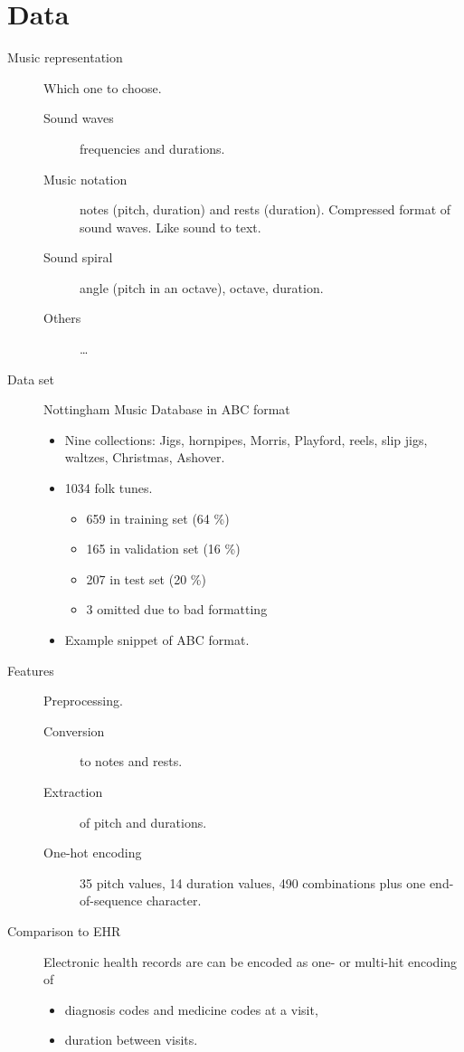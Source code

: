 \section{Data}
\label{sec:data}

\begin{description}
	\item[Music representation] Which one to choose.
	
	\begin{description}
		\item[Sound waves] frequencies and durations.
		\item[Music notation] notes (pitch, duration) and rests (duration).
		Compressed format of sound waves. Like sound to text.
		\item[Sound spiral] angle (pitch in an octave), octave, duration.
		\item[Others] \dots
	\end{description}
	
	\item[Data set] Nottingham Music Database in ABC format
	
	\begin{itemize}
		\item Nine collections: Jigs, hornpipes, Morris, Playford, reels, slip jigs, waltzes, Christmas, Ashover.
		\item 1034 folk tunes.
		
		\begin{itemize}
			\item 659 in training set (64 \%)
			\item 165 in validation set (16 \%)
			\item 207 in test set (20 \%)
			\item 3 omitted due to bad formatting
		\end{itemize}
		
		\item Example snippet of ABC format.
	\end{itemize}
	
	\item[Features] Preprocessing.
	
	\begin{description}
		\item[Conversion] to notes and rests.
		\item[Extraction] of pitch and durations.
		\item[One-hot encoding] 35 pitch values, 14 duration values, 490 combinations
plus one end-of-sequence character.
	\end{description}
	
	\item[Comparison to EHR] Electronic health records are can be encoded as one- or multi-hit encoding of
	
	\begin{itemize}
		\item diagnosis codes and medicine codes at a visit,
		\item duration between visits.
	\end{itemize}
\end{description}

